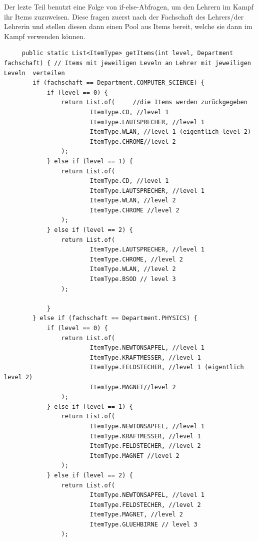 Der lezte Teil benutzt eine Folge von if-else-Abfragen, um den Lehrern im Kampf ihr Items zuzuweisen. Diese fragen zuerst nach der Fachschaft des Lehrers/der Lehrerin und stellen diesen dann einen Pool aus Items bereit, welche sie dann im Kampf verwenden können.
\\
\begin{lstlisting}
     public static List<ItemType> getItems(int level, Department fachschaft) { // Items mit jeweiligen Leveln an Lehrer mit jeweiligen Leveln  verteilen
        if (fachschaft == Department.COMPUTER_SCIENCE) {
            if (level == 0) {
                return List.of(     //die Items werden zurückgegeben
                        ItemType.CD, //level 1
                        ItemType.LAUTSPRECHER, //level 1
                        ItemType.WLAN, //level 1 (eigentlich level 2)
                        ItemType.CHROME//level 2
                );
            } else if (level == 1) {
                return List.of(
                        ItemType.CD, //level 1
                        ItemType.LAUTSPRECHER, //level 1
                        ItemType.WLAN, //level 2
                        ItemType.CHROME //level 2
                );
            } else if (level == 2) {
                return List.of(
                        ItemType.LAUTSPRECHER, //level 1
                        ItemType.CHROME, //level 2
                        ItemType.WLAN, //level 2
                        ItemType.BSOD // level 3
                );

            }
        } else if (fachschaft == Department.PHYSICS) {
            if (level == 0) {
                return List.of(
                        ItemType.NEWTONSAPFEL, //level 1
                        ItemType.KRAFTMESSER, //level 1
                        ItemType.FELDSTECHER, //level 1 (eigentlich level 2)
                        ItemType.MAGNET//level 2
                );
            } else if (level == 1) {
                return List.of(
                        ItemType.NEWTONSAPFEL, //level 1
                        ItemType.KRAFTMESSER, //level 1
                        ItemType.FELDSTECHER, //level 2
                        ItemType.MAGNET //level 2
                );
            } else if (level == 2) {
                return List.of(
                        ItemType.NEWTONSAPFEL, //level 1
                        ItemType.FELDSTECHER, //level 2
                        ItemType.MAGNET, //level 2
                        ItemType.GLUEHBIRNE // level 3
                );


\end{lstlisting}
